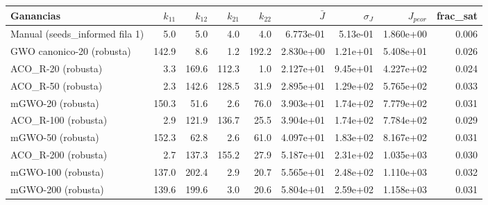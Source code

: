 \begin{tabular}{lrrrrrrrr}
\hline
Ganancias & $k_{11}$ & $k_{12}$ & $k_{21}$ & $k_{22}$ & $\bar J$ & $\sigma_J$ & $J_{peor}$ & frac\_sat \\
\hline
Manual (seeds\_informed fila 1) & 5.0 & 5.0 & 4.0 & 4.0 & 6.773e-01 & 5.13e-01 & 1.860e+00 & 0.006 \\
GWO canonico-20 (robusta) & 142.9 & 8.6 & 1.2 & 192.2 & 2.830e+00 & 1.21e+01 & 5.408e+01 & 0.026 \\
ACO\_R-20 (robusta) & 3.3 & 169.6 & 112.3 & 1.0 & 2.127e+01 & 9.45e+01 & 4.227e+02 & 0.024 \\
ACO\_R-50 (robusta) & 2.3 & 142.6 & 128.5 & 31.9 & 2.895e+01 & 1.29e+02 & 5.765e+02 & 0.033 \\
mGWO-20 (robusta) & 150.3 & 51.6 & 2.6 & 76.0 & 3.903e+01 & 1.74e+02 & 7.779e+02 & 0.031 \\
ACO\_R-100 (robusta) & 2.9 & 121.9 & 136.7 & 25.5 & 3.904e+01 & 1.74e+02 & 7.784e+02 & 0.029 \\
mGWO-50 (robusta) & 152.3 & 62.8 & 2.6 & 61.0 & 4.097e+01 & 1.83e+02 & 8.167e+02 & 0.031 \\
ACO\_R-200 (robusta) & 2.7 & 137.3 & 155.2 & 27.9 & 5.187e+01 & 2.31e+02 & 1.035e+03 & 0.030 \\
mGWO-100 (robusta) & 137.0 & 202.4 & 2.9 & 20.7 & 5.565e+01 & 2.48e+02 & 1.110e+03 & 0.032 \\
mGWO-200 (robusta) & 139.6 & 199.6 & 3.0 & 20.6 & 5.804e+01 & 2.59e+02 & 1.158e+03 & 0.031 \\
\hline
\end{tabular}
